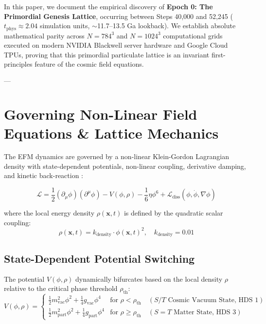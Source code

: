 \documentclass[11pt, twoside]{article}
\begin{document}
In this paper, we document the empirical discovery of \textbf{Epoch 0: The Primordial Genesis Lattice}, occurring between Steps 40,000 and 52,245 ($t_{\text{phys}} \approx 2.04$ simulation units, $\sim$11.7--13.5 Ga lookback). We establish absolute mathematical parity across $N=784^3$ and $N=1024^3$ computational grids executed on modern NVIDIA Blackwell server hardware and Google Cloud TPUs, proving that this primordial particulate lattice is an invariant first-principles feature of the cosmic field equations.

---

\section{Governing Non-Linear Field Equations \& Lattice Mechanics}

The EFM dynamics are governed by a non-linear Klein-Gordon Lagrangian density with state-dependent potentials, non-linear coupling, derivative damping, and kinetic back-reaction \citep{emvula2025intro}:

\begin{equation}
\label{eq:lagrangian}
\mathcal{L} = \frac{1}{2} (\partial_\mu \phi)(\partial^\mu \phi) - V(\phi, \rho) - \frac{1}{6}\eta \phi^6 + \mathcal{L}_{\text{diss}}(\phi, \dot{\phi}, \nabla\phi)
\end{equation}

where the local energy density $\rho(\mathbf{x}, t)$ is defined by the quadratic scalar coupling:
\begin{equation}
\label{eq:density}
\rho(\mathbf{x}, t) = k_{\text{density}} \cdot \phi(\mathbf{x}, t)^2, \quad k_{\text{density}} = 0.01
\end{equation}

\subsection{State-Dependent Potential Switching}
The potential $V(\phi, \rho)$ dynamically bifurcates based on the local density $\rho$ relative to the critical phase threshold $\rho_{\text{th}}$:
\begin{equation}
\label{eq:potential}
V(\phi, \rho) = 
\begin{cases} 
\frac{1}{2} m_{\text{vac}}^2 \phi^2 + \frac{1}{4} g_{\text{vac}} \phi^4 & \text{for } \rho < \rho_{\text{th}} \quad (S/T \text{ Cosmic Vacuum State, HDS 1}) \\
\frac{1}{2} m_{\text{part}}^2 \phi^2 + \frac{1}{4} g_{\text{part}} \phi^4 & \text{for } \rho \ge \rho_{\text{th}} \quad (S=T \text{ Matter State, HDS 3})
\end{cases}
\end{equation}
\end{document}
